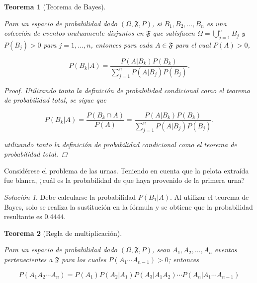 \documentclass[
  us-letterpaper,
]{scrreprt}
\theoremstyle{plain}
\newtheorem{theorem}{Teorema}[chapter]
\theoremstyle{definition}
\theoremstyle{definition}
\theoremstyle{plain}
\theoremstyle{remark}
\newtheorem*{solution}{Solución}
\begin{document}
\begin{theorem}[Teorema de
Bayes]\protect\hypertarget{thm-bayes}{}\label{thm-bayes}

Para un espacio de probabilidad dado \((\Omega, \mathfrak{F}, P)\), si
\(B_1, B_2, \ldots, B_n\) es una colección de eventos mutuamente
disjuntos en \(\mathfrak{F}\) que satisfacen
\(\Omega=\bigcup\limits_{j=1}^n B_j\) y \(P(B_j)>0\) para
\(j=1,\ldots, n\), entonces para cada \(A\in\mathfrak{F}\) para el cual
\(P(A)>0\),

\[P(B_k|A)= \frac{P(A|B_k)P(B_k)}{\sum\limits_{j=1}^n P(A|B_j)P(B_j)}.\]

\begin{proof}
Utilizando tanto la definición de probabilidad condicional como el
teorema de probabilidad total, se sigue que

\[P(B_k|A)= \frac{P(B_k\cap A)}{P(A)}=\frac{P(A|B_k)P(B_k)}{\sum\limits_{j=1}^n P(A|B_j)P(B_j)}.\]

utilizando tanto la definición de probabilidad condicional como el
teorema de probabilidad total.
\end{proof}

\end{theorem}

\begin{tcolorbox}[enhanced jigsaw, breakable, colbacktitle=quarto-callout-caution-color!10!white, rightrule=.15mm, toptitle=1mm, colback=white, left=2mm, colframe=quarto-callout-caution-color-frame, bottomtitle=1mm, opacitybacktitle=0.6, leftrule=.75mm, arc=.35mm, title={Ejemplo (\textbf{\emph{Seleccionar una pelota de varias urnas}})}, coltitle=black, titlerule=0mm, opacityback=0, bottomrule=.15mm, toprule=.15mm]

Considérese el problema de las urnas. Teniendo en cuenta que la pelota
extraída fue blanca, ¿cuál es la probabilidad de que haya provenido de
la primera urna?

\begin{solution}
Debe calcularse la probabilidad \(P(B_1|A)\). Al utilizar el teorema de
Bayes, solo se realiza la sustitución en la fórmula y se obtiene que la
probabilidad resultante es \(0.4444\).
\end{solution}

\end{tcolorbox}

\begin{theorem}[Regla de
multiplicación]\protect\hypertarget{thm-mult}{}\label{thm-mult}

Para un espacio de probabilidad dado \((\Omega, \mathfrak{F}, P)\), sean
\(A_1, A_2, \ldots, A_n\) eventos pertenecientes a \(\mathfrak{F}\) para
los cuales \(P(A_1\cdots A_{n-1})>0\); entonces

\[P(A_1A_2\cdots A_n)= P(A_1)P(A_2|A_1)P(A_3|A_1A_2)\cdots P(A_n|A_1\cdots A_{n-1})\]

\end{theorem}
\end{document}
